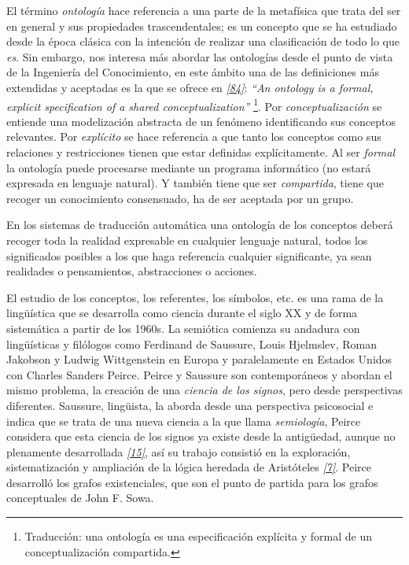 \documentclass[a4paper,12pt,spanish]{book}
\begin{document}
El término \emph{ontología} hace referencia a una parte de la metafísica que trata del ser en
general y sus propiedades trascendentales; es un concepto que se ha estudiado desde la época
clásica con la intención de realizar una clasificación de todo lo que \emph{es}.
Sin embargo, nos interesa más abordar las ontologías desde el punto de vista de la
Ingeniería del Conocimiento, en este ámbito
una de las definiciones más extendidas y aceptadas es la que se ofrece en \label{1.state-of-the-art/i.representacion-conocimiento:id20}{\hyperref[zreferences:studer1998]{\emph{{[}84{]}}}}:
\emph{``An ontology is a formal, explicit specification of a shared conceptualization''} \footnote{
Traducción: una ontología es una especificación explícita y formal de un
conceptualización compartida.
}. Por
\emph{conceptualización} se entiende una modelización abstracta de un fenómeno identificando sus
conceptos relevantes. Por \emph{explícito} se hace referencia a que tanto los conceptos como sus
relaciones y restricciones tienen que estar definidas explícitamente. Al ser \emph{formal} la
ontología puede procesarse mediante un programa informático (no estará expresada en lenguaje
natural). Y también tiene que ser \emph{compartida}, tiene que recoger un conocimiento consensuado,
ha de ser aceptada por un grupo.

En los sistemas de traducción automática una ontología de los conceptos deberá recoger toda
la realidad expresable en cualquier lenguaje natural, todos los significados posibles a los
que haga referencia cualquier significante, ya sean realidades o pensamientos, abstracciones
o acciones.

El estudio de los conceptos, los referentes, los símbolos, etc. es una rama de la lingüística que
se desarrolla como ciencia durante el siglo XX y de forma sistemática a partir de los 1960s.
La semiótica comienza su andadura con lingüísticas y filólogos como Ferdinand de Saussure,
Louis Hjelmslev, Roman Jakobson y Ludwig Wittgenstein en Europa y paralelamente en
Estados Unidos con Charles Sanders Peirce. Peirce y Saussure son contemporáneos y abordan el
mismo problema, la creación de una \emph{ciencia de los signos}, pero desde perspectivas diferentes.
Saussure, lingüista, la aborda desde una perspectiva psicosocial e indica que se trata de una
nueva ciencia a la que llama \emph{semiología}, Peirce considera que esta
ciencia de los signos ya existe desde la antigüedad, aunque no plenamente desarrollada
\label{1.state-of-the-art/i.representacion-conocimiento:id23}{\hyperref[zreferences:castanares2000]{\emph{{[}15{]}}}}, así su trabajo consistió en la exploración, sistematización y ampliación
de la lógica heredada de Aristóteles \label{1.state-of-the-art/i.representacion-conocimiento:id24}{\hyperref[zreferences:peirce1902]{\emph{{[}7{]}}}}. Peirce desarrolló los grafos
existenciales, que son el punto de partida para los grafos conceptuales de John F. Sowa.
\end{document}
